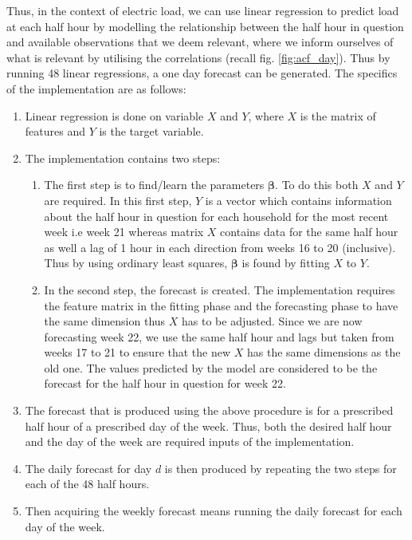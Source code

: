 Thus, in the context of electric load, we can use linear regression to predict load at each half hour by modelling the relationship between the half hour in question and available observations that we deem relevant, where we inform ourselves of what is relevant by utilising the correlations (recall fig. \ref{fig:acf_day}). Thus by running 48 linear regressions, a one day forecast can be generated. The specifics of the implementation are as follows:
\begin{enumerate}
\item Linear regression is done on variable $X$ and $Y$, where $X$ is the matrix of features and $Y$ is the target variable.
\item The implementation contains two steps: \begin{enumerate} \item The first step is to find/learn the parameters $\boldsymbol \beta$. To do this both $X$ and $Y$ are required. In this first step, $Y$ is a vector which contains information about the half hour in question for each household for the most recent week i.e week 21 whereas matrix $X$ contains data for the same half hour as well a lag of 1 hour in each direction from weeks 16 to 20 (inclusive). Thus by using ordinary least squares, $\boldsymbol \beta$ is found by fitting $X$ to $Y$.
\item In the second step, the forecast is created. The implementation requires the feature matrix in the fitting phase and the forecasting phase to have the same dimension thus $X$ has to be adjusted. Since we are now forecasting week 22, we use the same half hour and lags but taken from weeks 17 to 21 to ensure that the new $X$ has the same dimensions as the old one. The values predicted by the model are considered to be the forecast for the half hour in question for week 22. \end{enumerate}
\item The forecast that is produced using the above procedure is for a prescribed half hour of a prescribed day of the week. Thus, both the desired half hour and the day of the week are required inputs of the implementation.
\item The daily forecast for day $d$ is then produced by repeating the two steps for each of the 48 half hours.
\item Then acquiring the weekly forecast means running the daily forecast for each day of the week.
\end{enumerate}

